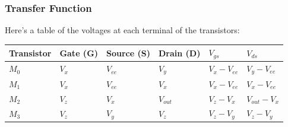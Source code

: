 \subsubsection{Transfer Function}
Here's a table of the voltages at each terminal of the
transistors:\\
\begin{tabularx}{\linewidth}{|X|X|X|X|X|X|} \hline
  Transistor & Gate (G) & Source (S) & Drain (D) & $V_{gs}$ & $V_{ds}$ \\ \hline
  $M_0$ & $V_{x}$ & $V_{ee}$ & $V_{y}$ & $V_{x} - V_{ee}$ & $V_{y} - V_{ee}$ \\ \hline
  $M_1$ & $V_{x}$ & $V_{ee}$ & $V_{x}$ & $V_{x} - V_{ee}$ & $V_{x} - V_{ee}$ \\ \hline
  $M_2$ & $V_{z}$ & $V_{x}$ & $V_{out}$ & $V_{z} - V_{x}$ & $V_{out} - V_{x}$ \\ \hline
  $M_3$ & $V_{z}$ & $V_{y}$ & $V_{z}$ & $V_{z} - V_{y}$ & $V_{z} - V_{y}$ \\ \hline
\end{tabularx}\\

